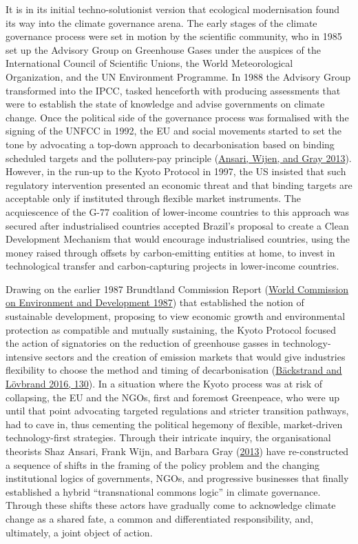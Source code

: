 \documentclass[a4paper, nobind]{templates/ociamthesis}
\begin{document}
It is in its initial techno-solutionist version that ecological modernisation found its way into the climate governance arena. The early stages of the climate governance process were set in motion by the scientific community, who in 1985 set up the Advisory Group on Greenhouse Gases under the auspices of the International Council of Scientific Unions, the World Meteorological Organization, and the UN Environment Programme. In 1988 the Advisory Group transformed into the IPCC, tasked henceforth with producing assessments that were to establish the state of knowledge and advise governments on climate change. Once the political side of the governance process was formalised with the signing of the UNFCC in 1992, the EU and social movements started to set the tone by advocating a top-down approach to decarbonisation based on binding scheduled targets and the polluters-pay principle (\protect\hyperlink{ref-ansari_constructing_2013}{Ansari, Wijen, and Gray 2013}). However, in the run-up to the Kyoto Protocol in 1997, the US insisted that such regulatory intervention presented an economic threat and that binding targets are acceptable only if instituted through flexible market instruments. The acquiescence of the G-77 coalition of lower-income countries to this approach was secured after industrialised countries accepted Brazil's proposal to create a Clean Development Mechanism that would encourage industrialised countries, using the money raised through offsets by carbon-emitting entities at home, to invest in technological transfer and carbon-capturing projects in lower-income countries.

Drawing on the earlier 1987 Brundtland Commission Report (\protect\hyperlink{ref-world_commission_on_environment_and_development_our_1987}{World Commission on Environment and Development 1987}) that established the notion of sustainable development, proposing to view economic growth and environmental protection as compatible and mutually sustaining, the Kyoto Protocol focused the action of signatories on the reduction of greenhouse gasses in technology-intensive sectors and the creation of emission markets that would give industries flexibility to choose the method and timing of decarbonisation (\protect\hyperlink{ref-backstrand_climate_2016}{Bäckstrand and Lövbrand 2016, 130}). In a situation where the Kyoto process was at risk of collapsing, the EU and the NGOs, first and foremost Greenpeace, who were up until that point advocating targeted regulations and stricter transition pathways, had to cave in, thus cementing the political hegemony of flexible, market-driven technology-first strategies. Through their intricate inquiry, the organisational theorists Shaz Ansari, Frank Wijn, and Barbara Gray (\protect\hyperlink{ref-ansari_constructing_2013}{2013}) have re-constructed a sequence of shifts in the framing of the policy problem and the changing institutional logics of governments, NGOs, and progressive businesses that finally established a hybrid ``transnational commons logic'' in climate governance. Through these shifts these actors have gradually come to acknowledge climate change as a shared fate, a common and differentiated responsibility, and, ultimately, a joint object of action.
\end{document}
